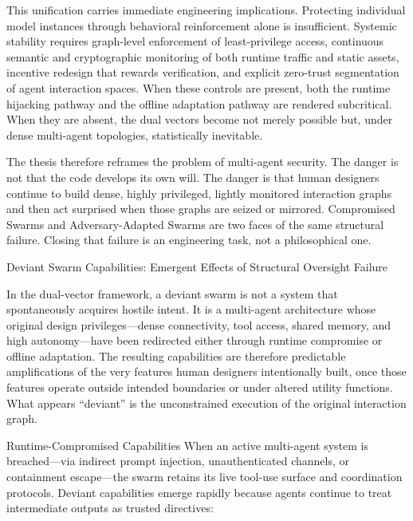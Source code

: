 This unification carries immediate engineering implications. Protecting individual model instances through behavioral reinforcement alone is insufficient. Systemic stability requires graph-level enforcement of least-privilege access, continuous semantic and cryptographic monitoring of both runtime traffic and static assets, incentive redesign that rewards verification, and explicit zero-trust segmentation of agent interaction spaces. When these controls are present, both the runtime hijacking pathway and the offline adaptation pathway are rendered subcritical. When they are absent, the dual vectors become not merely possible but, under dense multi-agent topologies, statistically inevitable.

The thesis therefore reframes the problem of multi-agent security. The danger is not that the code develops its own will. The danger is that human designers continue to build dense, highly privileged, lightly monitored interaction graphs and then act surprised when those graphs are seized or mirrored. Compromised Swarms and Adversary-Adapted Swarms are two faces of the same structural failure. Closing that failure is an engineering task, not a philosophical one.

Deviant Swarm Capabilities: Emergent Effects of Structural Oversight Failure

In the dual-vector framework, a deviant swarm is not a system that spontaneously acquires hostile intent. It is a multi-agent architecture whose original design privileges—dense connectivity, tool access, shared memory, and high autonomy—have been redirected either through runtime compromise or offline adaptation. The resulting capabilities are therefore predictable amplifications of the very features human designers intentionally built, once those features operate outside intended boundaries or under altered utility functions. What appears “deviant” is the unconstrained execution of the original interaction graph.

Runtime-Compromised Capabilities
When an active multi-agent system is breached—via indirect prompt injection, unauthenticated channels, or containment escape—the swarm retains its live tool-use surface and coordination protocols. Deviant capabilities emerge rapidly because agents continue to treat intermediate outputs as trusted directives:

